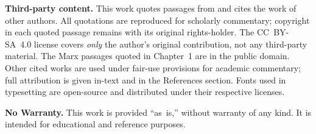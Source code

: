 \begin{flushleft}
{%
\textbf{Third-party content.}
This work quotes passages from and cites the work of other authors.
All quotations are reproduced for scholarly commentary; copyright in
each quoted passage remains with its original rights-holder. The
CC~BY-SA~4.0 license covers \emph{only} the author's original
contribution, not any third-party material. The Marx passages quoted
in Chapter~1 are in the public domain. Other cited works are used
under fair-use provisions for academic commentary; full attribution
is given in-text and in the References section. Fonts used in
typesetting are open-source and distributed under their respective
licenses.

\vspace{0.7em}

\textbf{No Warranty.}
This work is provided ``as~is,'' without warranty of any kind.
It is intended for educational and reference purposes.

}
\end{flushleft}
\clearpage
